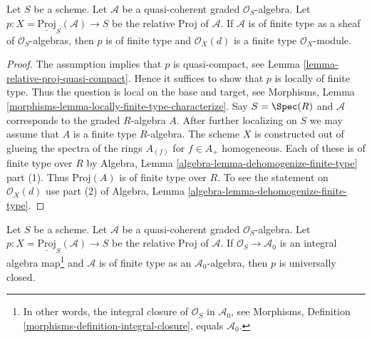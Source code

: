 \begin{lemma}
\label{lemma-relative-proj-finite-type}
Let $S$ be a scheme. Let $\mathcal{A}$ be a quasi-coherent graded
$\mathcal{O}_S$-algebra. Let
$p : X = \underline{\text{Proj}}_S(\mathcal{A}) \to S$ be the relative
Proj of $\mathcal{A}$. If $\mathcal{A}$ is of finite type as a sheaf of
$\mathcal{O}_S$-algebras, then $p$ is of finite type and $\mathcal{O}_X(d)$
is a finite type $\mathcal{O}_X$-module.
\end{lemma}

\begin{proof}
The assumption implies that $p$ is quasi-compact, see
Lemma \ref{lemma-relative-proj-quasi-compact}. Hence it suffices
to show that $p$ is locally of finite type.
Thus the question is local on the base and target, see
Morphisms, Lemma \ref{morphisms-lemma-locally-finite-type-characterize}.
Say $S = \Spec(R)$ and $\mathcal{A}$ corresponds to the
graded $R$-algebra $A$. After further localizing on $S$ we may
assume that $A$ is a finite type $R$-algebra. The scheme $X$ is constructed
out of glueing the spectra of the rings $A_{(f)}$ for $f \in A_{+}$
homogeneous. Each of these is of finite type over $R$ by
Algebra, Lemma \ref{algebra-lemma-dehomogenize-finite-type} part (1).
Thus $\text{Proj}(A)$ is of finite type over $R$.
To see the statement on $\mathcal{O}_X(d)$ use part (2) of
Algebra, Lemma \ref{algebra-lemma-dehomogenize-finite-type}.
\end{proof}

\begin{lemma}
\label{lemma-relative-proj-universally-closed}
Let $S$ be a scheme. Let $\mathcal{A}$ be a quasi-coherent graded
$\mathcal{O}_S$-algebra. Let
$p : X = \underline{\text{Proj}}_S(\mathcal{A}) \to S$ be the relative
Proj of $\mathcal{A}$. If $\mathcal{O}_S \to \mathcal{A}_0$
is an integral algebra map\footnote{In other words, the integral
closure of $\mathcal{O}_S$ in $\mathcal{A}_0$, see
Morphisms, Definition \ref{morphisms-definition-integral-closure}, equals
$\mathcal{A}_0$.} and $\mathcal{A}$ is of finite type as an
$\mathcal{A}_0$-algebra, then $p$ is universally closed.
\end{lemma}

